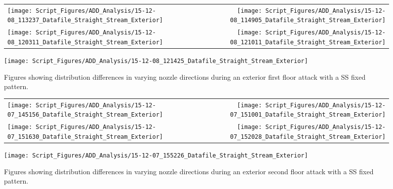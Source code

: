 \documentclass{article}
\begin{document}
\begin{figure}[ht]
\begin{tabular*}{\textwidth}{lr}
\texttt{[image: Script\_Figures/ADD\_Analysis/15-12-08\_113237\_Datafile\_Straight\_Stream\_Exterior]} &
\texttt{[image: Script\_Figures/ADD\_Analysis/15-12-08\_114905\_Datafile\_Straight\_Stream\_Exterior]} \\
\texttt{[image: Script\_Figures/ADD\_Analysis/15-12-08\_120311\_Datafile\_Straight\_Stream\_Exterior]} &
\texttt{[image: Script\_Figures/ADD\_Analysis/15-12-08\_121011\_Datafile\_Straight\_Stream\_Exterior]} \\
\end{tabular*}
\centering
\texttt{[image: Script\_Figures/ADD\_Analysis/15-12-08\_121425\_Datafile\_Straight\_Stream\_Exterior]} \\
\caption{Figures showing distribution differences in varying nozzle directions during an exterior first floor attack with a SS fixed pattern.}
\label{fig:Exterior_First_Floor_Varying_Nozzle_Directions_SS_Fixed_Pattern}
\end{figure}

\clearpage

\begin{figure}[ht]
\begin{tabular*}{\textwidth}{lr}
\texttt{[image: Script\_Figures/ADD\_Analysis/15-12-07\_145156\_Datafile\_Straight\_Stream\_Exterior]} &
\texttt{[image: Script\_Figures/ADD\_Analysis/15-12-07\_151001\_Datafile\_Straight\_Stream\_Exterior]} \\
\texttt{[image: Script\_Figures/ADD\_Analysis/15-12-07\_151630\_Datafile\_Straight\_Stream\_Exterior]} &
\texttt{[image: Script\_Figures/ADD\_Analysis/15-12-07\_152028\_Datafile\_Straight\_Stream\_Exterior]} \\
\end{tabular*}
\centering
\texttt{[image: Script\_Figures/ADD\_Analysis/15-12-07\_155226\_Datafile\_Straight\_Stream\_Exterior]} \\
\caption{Figures showing distribution differences in varying nozzle directions during an exterior second floor attack with a SS fixed pattern.}
\label{fig:Exterior_Second_Floor_Varying_Nozzle_Directions_SS_Fixed_Pattern}
\end{figure}

\clearpage
\end{document}
